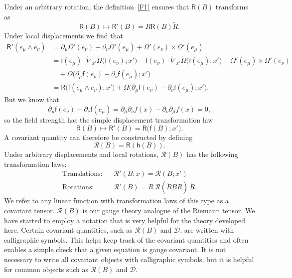 \documentclass[a4paper]{article}
\numberwithin{equation}{section}
\newcommand{\nn}{\nonumber}
\newcommand{\dt}{\! \cdot \!}
\newcommand{\wdg}{\! \wedge \!}
\newcommand{\crs}{\! \times \!}
\newcommand{\eqv}{=}
\newcommand{\Om}{\Omega}
\newcommand{\cld}{{\mathcal{D}}}
\newcommand{\clr}{{\mathcal{R}}}
\newcommand{\dmu}{\partial_{\mu}}
\newcommand{\dnu}{\partial_{\nu}}
\newcommand{\Rrev}{\tilde{R}}
\newcommand{\lif}{\mathsf{f}}
\newcommand{\lih}{\mathsf{h}}
\newcommand{\liR}{\mathsf{R}}
\newcommand{\hu}{\lih}
\newcommand{\grad}{\nabla}
\newcommand{\dgrad}{\dot{\grad}}
\begin{document}
Under an arbitrary rotation, the definition~\eqref{F1} ensures that $\liR(B)$
transforms as
%
\begin{equation}
\liR(B) \mapsto \liR'(B)=R \liR(B)  \Rrev.
\end{equation}
%
Under local displacements we find that
%
\begin{align}
\liR'(e_\mu \wdg e_\nu) 
&= \dmu \Om'(e_\nu) - \dnu \Om'(e_\mu) + \Om'(e_\nu) \crs \Om'(e_\mu)
\nn \\
&= \lif(e_\mu) \dt \dgrad_{x'} \dot{\Om}\bigl(\lif(e_\nu);x'\bigr)
 -  \lif(e_\nu) \dt \dgrad_{x'} \dot{\Om}\bigl(\lif(e_\mu);x'\bigr) 
+ \Om'(e_\mu) \crs \Om'(e_\nu) \nn \\
&\quad + \Om\bigl( \dmu \lif(e_\nu) - \dnu \lif(e_\mu); x'\bigr) \nn \\
&= \liR\bigl(\lif(e_\mu \wdg e_\nu );x'\bigr) 
+  \Om\bigl(  \dmu \lif(e_\nu) - \dnu \lif(e_\mu); x'\bigr).
\end{align}
%
But we know that 
%
\begin{equation} 
 \dmu \lif(e_\nu) - \dnu \lif(e_\mu) = \dmu \dnu f(x) - \dnu\dmu f(x)
 = 0, 
\end{equation} 
%
so the field strength has the simple displacement transformation law
%
\begin{equation} 
\liR(B) \mapsto \liR'(B) = \liR\bigl(\lif(B); x'\bigr).
\end{equation} 
%
A covariant quantity can therefore be constructed by defining
%
\begin{equation}
\clr(B) \eqv \liR(\hu(B)).
\end{equation}
%
Under arbitrary displacements and local rotations, $\clr(B)$ has the
following transformation laws:
%
\begin{equation}
\begin{array}{rcl}
\mbox{Translations:} & & \clr'(B;x)=\clr(B;x') \\
\mbox{Rotations:} & & \clr'(B)=R\, \clr(\Rrev BR) \, \Rrev. 
\end{array}
\label{F3}
\end{equation} 
%
We refer to any linear function with transformation laws of this type
as a covariant tensor.  $\clr(B)$ is our gauge theory analogue of the
Riemann tensor.  We have started to employ a notation that is very
helpful for the theory developed here.  Certain covariant quantities,
such as $\clr(B)$ and $\cld$, are written with calligraphic symbols.
This helps keep track of the covariant quantities and often enables a
simple check that a given equation is gauge covariant.  It is not
necessary to write all covariant objects with calligraphic symbols,
but it is helpful for common objects such as $\clr(B)$ and $\cld$.
\end{document}
